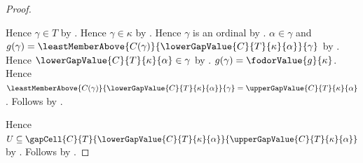 \begin{proof}
\begin{subproof}
        Hence $\gamma\in T$ by .
        Hence $\gamma\in\kappa$ by .
        Hence $\gamma$ is an ordinal by .
        $\alpha\in\gamma$ and
            $g(\gamma)=\leastMemberAbove{C(\gamma)}
                {\lowerGapValue{C}{T}{\kappa}{\alpha}}{\gamma}$
            by .
        Hence $\lowerGapValue{C}{T}{\kappa}{\alpha}\in\gamma$
            by .
        $g(\gamma)=\fodorValue{g}{\kappa}$.
        Hence $\leastMemberAbove{C(\gamma)}
            {\lowerGapValue{C}{T}{\kappa}{\alpha}}{\gamma}
                =\upperGapValue{C}{T}{\kappa}{\alpha}$.
        Follows by .
    \end{subproof}
    Hence $U\subseteq\gapCell{C}{T}
        {\lowerGapValue{C}{T}{\kappa}{\alpha}}
        {\upperGapValue{C}{T}{\kappa}{\alpha}}$ by .
    Follows by .
\end{proof}

